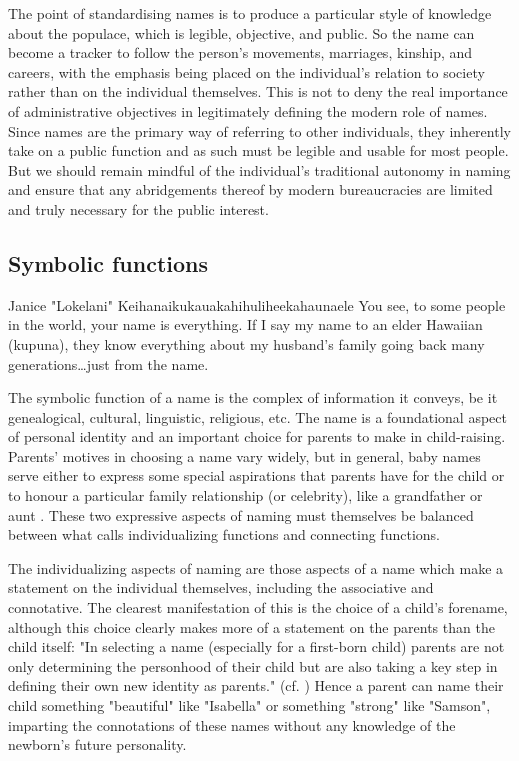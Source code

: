 The point of standardising names is to produce a particular style of knowledge
about the populace, which is legible, objective, and public. So the name can
become a tracker to follow the person's movements, marriages, kinship, and
careers, with the emphasis being placed on the individual's relation to society
rather than on the individual themselves. This is not to deny the real
importance of administrative objectives in legitimately defining the modern
role of names. Since names are the primary way of referring to other
individuals, they inherently take on a public function and as such must be
legible and usable for most people. But we should remain mindful of the
individual's traditional autonomy in naming and ensure that any abridgements
thereof by modern bureaucracies are limited and truly necessary for the public
interest.

\subsection{Symbolic functions}

\begin{aquote}{Janice "Lokelani" Keihanaikukauakahihuliheekahaunaele
	\parencite{lee-valley}}
	You see, to some people in the world, your name is everything. If I say my
	name to an elder Hawaiian (kupuna), they know everything about my husband's
	family going back many generations…just from the name.
\end{aquote}

The symbolic function of a name is the complex of information it conveys, be it
genealogical, cultural, linguistic, religious, etc. The name is a foundational
aspect of personal identity and an important choice for parents to make in
child-raising. Parents' motives in choosing a name vary widely, but in general,
baby names serve either to express some special aspirations that parents have
for the child or to honour a particular family relationship (or celebrity),
like a grandfather or aunt \parencite{finch08}. These two expressive aspects of
naming must themselves be balanced between what \textcite{finch08} calls
individualizing functions and connecting functions.

The individualizing aspects of naming are those aspects of a name which make a
statement on the individual themselves, including the associative and
connotative. The clearest manifestation of this is the choice of a child's
forename, although this choice clearly makes more of a statement on the parents
than the child itself: "In selecting a name (especially for a first-born child)
parents are not only determining the personhood of their child but are also
taking a key step in defining their own new identity as parents."
\parencite[718]{finch08} (cf. \parencite[399]{heymann11}) Hence a parent can
name their child something "beautiful" like "Isabella" or something "strong"
like "Samson", imparting the connotations of these names without any knowledge
of the newborn's future personality.


